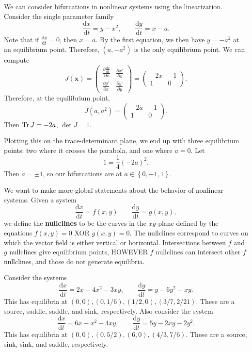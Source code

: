 We can consider bifurcations in nonlinear systems using the linearization. Consider the single parameter family
\[
	\frac{\mathrm{d}x}{\mathrm{d}t} =y-x^2,\qquad \frac{\mathrm{d}y}{\mathrm{d}t} =x-a
.\]
Note that if $\frac{\mathrm{d}y}{\mathrm{d}t} =0$, then $x=a$. By the first equation, we then have $y=-a^2$ at an equilibrium point. Therefore, $(a,-a^2 )$ is the only equilibrium point. We can compute
\[
	J(\mathbf{x})=\begin{pmatrix}
		\frac{\partial \frac{\mathrm{d}x}{\mathrm{d}t} }{\partial x} &\frac{\partial x'}{\partial y} \\[5pt]
		\frac{\partial y'}{\partial x} &\frac{\partial y'}{\partial y} 
	\end{pmatrix} =\begin{pmatrix}
		-2x&-1\\
		1&0
	\end{pmatrix} 
.\]
Therefore, at the equilibrium point,
\[
	J(a,a^2)=\begin{pmatrix}
		-2a&-1\\
		1&0
	\end{pmatrix} 
.\]
Then $\operatorname{Tr} J=-2a$, $\det J=1$.

Plotting this on the trace-determinant plane, we end up with three equilibrium points: two where it crosses the parabola, and one where $a=0$. Let
\[
	1=\frac{1}{4}(-2a)^2
.\]
Then $a=\pm 1$, so our bifurcations are at $a\in \left\{ 0,-1,1 \right\} $.

We want to make more global statements about the behavior of nonlinear systems. Given a system
\[
	\frac{\mathrm{d}x}{\mathrm{d}t} =f(x,y)\qquad \frac{\mathrm{d}y}{\mathrm{d}t} =g(x,y),\]
we define the \textbf{nullclines} to be the curves in the $xy $-plane defined by the equations $f(x,y)=0$ XOR $g(x,y)=0$. The nullclines correspond to curves on which the vector field is either vertical or horizontal. Intersections between $f$ and $g$ nullclines give equilibrium points, HOWEVER $f$ nullclines can intersect other $f$ nullclines, and those do not generate equilibria.

Consider the systems
\[
	\frac{\mathrm{d}x}{\mathrm{d}t} =2x-4x^2-3xy,\qquad \frac{\mathrm{d}y}{\mathrm{d}t} =y-6y^2-xy
.\]
This has equilibria at $(0,0), (0,1/6), (1 /2,0), (3 /7,2 /21)$. These are a source, saddle, saddle, and sink, respectively. Also consider the system
\[
	\frac{\mathrm{d}x}{\mathrm{d}t} =6x-x^2-4xy,\qquad \frac{\mathrm{d}y}{\mathrm{d}t} =5y-2xy-2y^2
.\]
This has equilibria at $(0,0),(0,5 /2),(6,0),(4 /3,7 /6)$. These are a source, sink, sink, and saddle, respectively.

